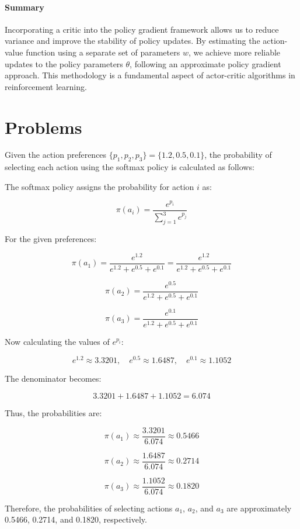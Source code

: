 \documentclass[10pt, oneside]{article}
\theoremstyle{definition}
\begin{document}
\paragraph{Summary}

Incorporating a critic into the policy gradient framework allows us to reduce variance and improve the stability of policy updates. By estimating the action-value function using a separate set of parameters \( w \), we achieve more reliable updates to the policy parameters \( \theta \), following an approximate policy gradient approach. This methodology is a fundamental aspect of actor-critic algorithms in reinforcement learning.


\section{Problems}

Given the action preferences \(\{p_1, p_2, p_3\} = \{1.2, 0.5, 0.1\}\), the probability of selecting each action using the softmax policy is calculated as follows:

The softmax policy assigns the probability for action \(i\) as:

\[
\pi(a_i) = \frac{e^{p_i}}{\sum_{j=1}^{3} e^{p_j}}
\]

For the given preferences:

\[
\pi(a_1) = \frac{e^{1.2}}{e^{1.2} + e^{0.5} + e^{0.1}} = \frac{e^{1.2}}{e^{1.2} + e^{0.5} + e^{0.1}}
\]

\[
\pi(a_2) = \frac{e^{0.5}}{e^{1.2} + e^{0.5} + e^{0.1}}
\]

\[
\pi(a_3) = \frac{e^{0.1}}{e^{1.2} + e^{0.5} + e^{0.1}}
\]

Now calculating the values of \(e^{p_i}\):

\[
e^{1.2} \approx 3.3201, \quad e^{0.5} \approx 1.6487, \quad e^{0.1} \approx 1.1052
\]

The denominator becomes:

\[
3.3201 + 1.6487 + 1.1052 = 6.074
\]

Thus, the probabilities are:

\[
\pi(a_1) \approx \frac{3.3201}{6.074} \approx 0.5466
\]

\[
\pi(a_2) \approx \frac{1.6487}{6.074} \approx 0.2714
\]

\[
\pi(a_3) \approx \frac{1.1052}{6.074} \approx 0.1820
\]

Therefore, the probabilities of selecting actions \(a_1\), \(a_2\), and \(a_3\) are approximately 0.5466, 0.2714, and 0.1820, respectively.
\end{document}
